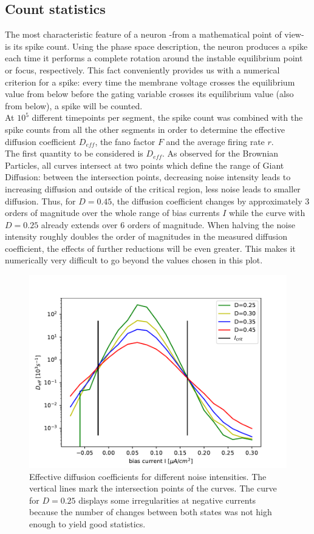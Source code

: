 \documentclass[12pt,a4paper]{article}
\begin{document}
\subsection{Count statistics}
The most characteristic feature of a neuron -from a mathematical point of view- is its spike count. Using the phase space description, the neuron produces a spike each time it performs a complete rotation around the instable equilibrium point or focus, respectively. This fact conveniently provides us with a numerical criterion for a spike:
every time the membrane voltage crosses the equilibrium value from below before the gating variable crosses its equilibrium value (also from below), a spike will be counted. \\
At $10^5$ different timepoints per segment, the spike count was combined with the spike counts from all the other segments in order to determine the effective diffusion coefficient $D_{eff}$, the fano factor $F$ and the average firing rate $r$. \\
The first quantity to be considered is $D_{eff}$.
As observed for the Brownian Particles, all curves intersect at two points which define the range of Giant Diffusion: between the intersection points, decreasing noise intensity leads to increasing diffusion and outside of the critical region, less noise leads to smaller diffusion. Thus, for $D=0.45$, the diffusion coefficient changes by approximately 3 orders of magnitude over the whole range of bias currents $I$ while the curve with $D=0.25$ already extends over 6 orders of magnitude. When halving the noise intensity roughly doubles the order of magnitudes in the measured diffusion coefficient, the effects of further reductions will be even greater. This makes it numerically very difficult to go beyond the values chosen in this plot.
\begin{figure}[H]
	\centering
	\includegraphics[scale=1]{deffcrit.pdf}\caption{Effective diffusion coefficients for different noise intensities. The vertical lines mark the intersection points of the curves. The curve for $D=0.25$ displays some irregularities at negative currents because the number of changes between both states was not high enough to yield good statistics.}
	\label{deff}
\end{figure}
\end{document}
